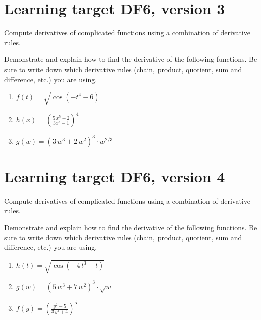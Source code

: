 \pagebreak

\section{Learning target DF6, version 3}

Compute derivatives of complicated functions using a combination of derivative rules.

\hrulefill

Demonstrate and explain how to find the derivative of the following functions. Be sure to write down which derivative rules (chain, product, quotient, sum and difference, etc.) you are using.

\begin{enumerate}
    \item \(f(t) = \sqrt{\cos\left(-t^{4} - 6\right)}\)
    \vfill
    \item \(h(x) = \left( \frac{5 \, x^{5} - 2}{3 x^{3} - 1} \right)^{ 4 }\)
    \vfill
    \item \(g(w) = {\left(3 \, w^{3} + 2 \, w^{2}\right)}^{3} \cdot w^{2/3}\)
    \vfill
\end{enumerate}

\pagebreak

\section{Learning target DF6, version 4}

Compute derivatives of complicated functions using a combination of derivative rules.

\hrulefill

Demonstrate and explain how to find the derivative of the following functions. Be sure to write down which derivative rules (chain, product, quotient, sum and difference, etc.) you are using.

\begin{enumerate}
    \item \(h(t) = \sqrt{\cos\left(-4 \, t^{3} - t\right)}\)
    \vfill
    \item \(g(w) = {\left(5 \, w^{3} + 7 \, w^{2}\right)}^{3} \cdot \sqrt{w}\)
    \vfill
    \item \(f(y) = \left(\frac{y^{2} - 5}{3 \, y^{3} + 4} \right)^{ 5 }\)
    \vfill
\end{enumerate}

\pagebreak


